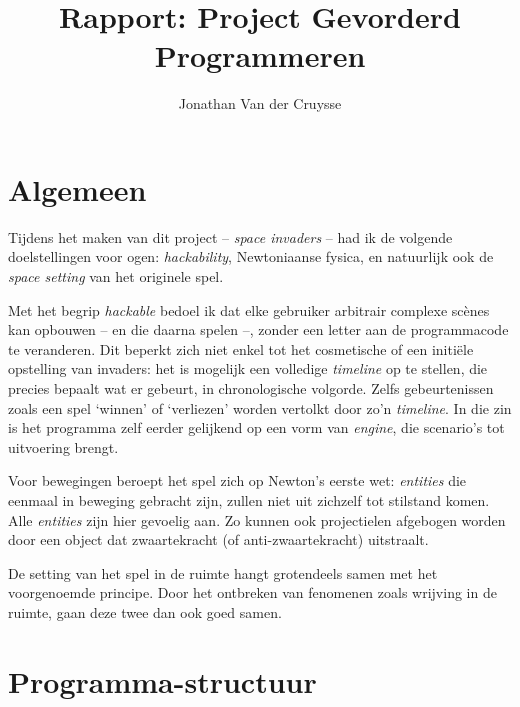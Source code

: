 \documentclass[10pt,a4paper]{article}
\author{Jonathan Van der Cruysse}
\title{Rapport: Project Gevorderd Programmeren}
\begin{document}
	
\newcommand{\classname}[1]
{
	\selectlanguage{english}
	\textsf{#1}
	\selectlanguage{dutch}
}
	
\maketitle

\section{Algemeen}
Tijdens het maken van dit project 
-- \emph{space invaders} -- had ik de volgende
doelstellingen voor ogen: \emph{hackability}, 
Newtoniaanse fysica, en natuurlijk ook de \emph{space setting}
van het originele spel. 

Met het begrip \emph{hackable} bedoel ik dat elke gebruiker arbitrair
complexe sc\`enes kan opbouwen -- en die daarna spelen --, zonder een 
letter aan de programmacode te veranderen. Dit beperkt zich niet enkel
tot het cosmetische of een initi\"ele opstelling van invaders: het is 
mogelijk een volledige \emph{timeline} op te stellen, die precies
bepaalt wat er gebeurt, in chronologische volgorde. 
Zelfs gebeurtenissen zoals een spel `winnen' of `verliezen' worden 
vertolkt door zo'n \emph{timeline}. In die zin is
het programma zelf eerder gelijkend op een vorm van \emph{engine}, die 
scenario's tot uitvoering brengt.

Voor bewegingen beroept het spel zich op Newton's eerste wet: 
\emph{entities} die eenmaal in beweging gebracht zijn, zullen niet
uit zichzelf tot stilstand komen. Alle \emph{entities} zijn hier gevoelig
aan. Zo kunnen ook projectielen afgebogen worden door een object dat 
zwaartekracht (of anti-zwaartekracht) uitstraalt.

De setting van het spel in de ruimte hangt grotendeels samen met het 
voorgenoemde principe. Door het ontbreken van fenomenen zoals wrijving
in de ruimte, gaan deze twee dan ook goed samen.


\section{Programma-structuur}
\end{document}
